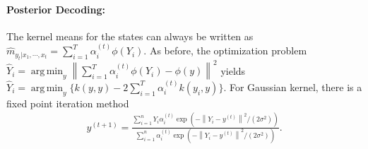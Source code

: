 \documentclass[a4paper]{article}
\newcommand{\norm}[1]{\left\lVert#1\right\rVert}
\DeclareMathOperator*{\argmin}{arg\,min}
\begin{document}
\paragraph{Posterior Decoding:} The kernel means for the states can always be written as $\hat{m}_{y_t|x_1,\cdots,x_t} = \sum_{i=1}^T \alpha_i^{(t)}\phi(Y_i)$. As before, the optimization problem $\hat{Y}_i = \argmin_{y}\norm{\sum_{i=1}^T \alpha_i^{(t)}\phi(Y_i) - \phi(y)}^2$ yields $\hat{Y}_i = \argmin_y \{ k(y,y) - 2\sum_{i=1}^T \alpha_i^{(t)}k(y_i,y)\}$. For Gaussian kernel, there is a fixed point iteration method
\begin{align}
y^{(t+1)} = \frac{\sum_{i=1}^n Y_i \alpha_i^{(t)}\exp(-\norm{Y_i-y^{(t)}}^2/(2\sigma^2))}{\sum_{i=1}^n \alpha_i^{(t)}\exp(-\norm{Y_i-y^{(t)}}^2/(2\sigma^2))}.
\end{align}

\end{document}
